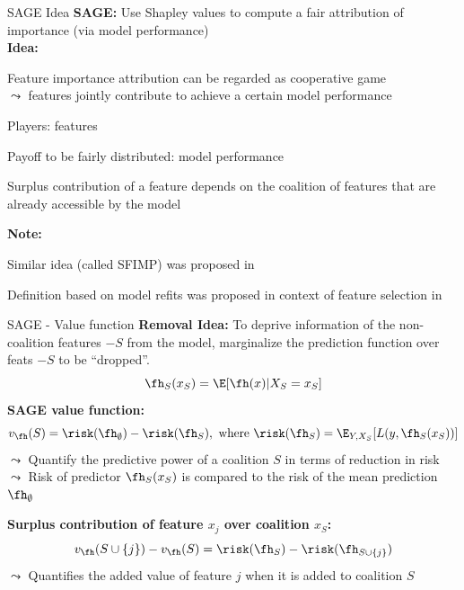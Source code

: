 \documentclass[10pt,compress,t,notes=noshow, xcolor=table]{beamer}
\begin{document}
\begin{framev}[align=top]{SAGE Idea }
\textbf{SAGE:}
Use Shapley values to compute a fair attribution of importance (via model performance)\\
\spacer[0.25]
\textbf{Idea:}
\begin{itemizeM}
\item Feature importance attribution can be regarded as cooperative game \\
$\leadsto$ features jointly contribute to achieve a certain model performance
\item Players: features
\item Payoff to be fairly distributed: model performance
\item Surplus contribution of a feature depends on the coalition of features that are already accessible by the model
\end{itemizeM}
\spacer[0.25]
\textbf{Note:}
\begin{itemizeM}
\item Similar idea (called SFIMP) was proposed in 
\item Definition based on model refits was proposed in context of feature selection in 
\end{itemizeM}
\spacer[0.25]
\end{framev}


\begin{framev}[align=top]{SAGE - Value function}
\textbf{Removal Idea:} %
To deprive information of the non-coalition features $-S$ from the model, marginalize the prediction function over feats $-S$ to be ``dropped''.
$$
\fh_S(x_S) = \E[\fh(x) | X_S = x_S]
$$
\pause
\spacer[0.25]
\textbf{SAGE value function:}
$$
v_{\fh}(S) = \risk(\fh_{\emptyset}) - \risk(\fh_{S}), \text{ where } \risk(\fh_{S}) = \E_{Y, X_S}[L(y, \fh_S(x_S))]
$$
$\leadsto$ Quantify the predictive power of a coalition $S$ in terms of reduction in risk \\
$\leadsto$ Risk of predictor $\fh_S(x_S)$ is compared to the risk of the mean prediction $\fh_{\emptyset}$
\pause

\spacer[0.5]
\textbf{Surplus contribution of feature $x_j$ over coalition $x_S$:}
$$
v_{\fh}(S \cup \{j\}) - v_{\fh}(S) = \risk(\fh_{S}) - \risk(\fh_{S \cup \{j\}})
$$
$\leadsto$ Quantifies the added value of feature $j$ when it is added to coalition $S$
\end{framev}
\end{document}

